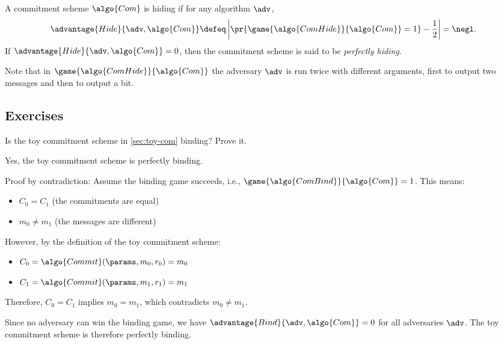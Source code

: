 \begin{definition}[Hiding]
  A commitment scheme $\algo{Com}$ is hiding if for any \ppt algorithm $\adv$,
 \[
  \advantage{Hide}{\adv, \algo{Com}} \defeq \left|\pr{\game{\algo{ComHide}}{\algo{Com}} = 1} - \frac{1}{2}\right| = \negl.
 \]
 If $\advantage{Hide}{\adv, \algo{Com}} = 0$, then the commitment scheme is said to be \emph{perfectly hiding}.
\end{definition}

Note that in $\game{\algo{ComHide}}{\algo{Com}}$ the adversary $\adv$ is run twice with different arguments, first to output two messages and then to output a bit.

\subsection{Exercises}

\begin{exercise}
  Is the toy commitment scheme in \cref{sec:toy-com} binding?
  Prove it.
\end{exercise}

\ifsolutions
\begin{mysolution}
  Yes, the toy commitment scheme is perfectly binding.
  
  Proof by contradiction: Assume the binding game succeeds, i.e., $\game{\algo{ComBind}}{\algo{Com}} = 1$.
  This means:
  \begin{itemize}
    \item $C_0 = C_1$ (the commitments are equal)
    \item $m_0 \neq m_1$ (the messages are different)
  \end{itemize}
  
  However, by the definition of the toy commitment scheme:
  \begin{itemize}
    \item $C_0 = \algo{Commit}(\params, m_0, r_0) = m_0$
    \item $C_1 = \algo{Commit}(\params, m_1, r_1) = m_1$
  \end{itemize}
  
  Therefore, $C_0 = C_1$ implies $m_0 = m_1$, which contradicts $m_0 \neq m_1$.
  
  Since no adversary can win the binding game, we have $\advantage{Bind}{\adv, \algo{Com}} = 0$ for all adversaries $\adv$.
  The toy commitment scheme is therefore perfectly binding.
\end{mysolution}
\fi


